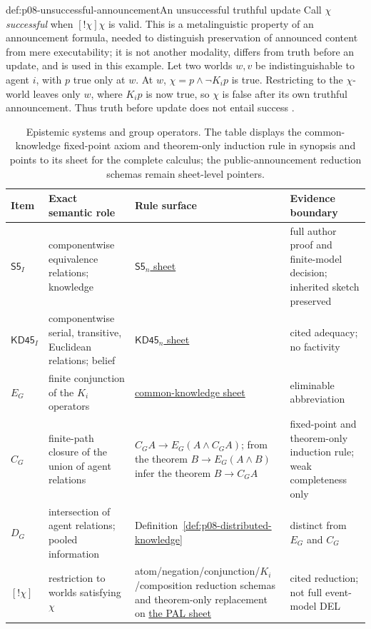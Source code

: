 \begin{hbexample}{def:p08-unsuccessful-announcement}{An unsuccessful truthful update}
Call \(\chi\) \emph{successful} when \([!\chi]\chi\) is valid.  This is a
metalinguistic property of an announcement formula, needed to distinguish
preservation of announced content from mere executability; it is not another
modality, differs from truth before an update, and is used in this example.
Let two worlds \(w,v\) be indistinguishable to agent \(i\), with \(p\) true
only at \(w\).  At \(w\), \(\chi=p\land\neg K_ip\) is true.  Restricting to
the \(\chi\)-world leaves only \(w\), where \(K_ip\) is now true, so \(\chi\)
is false after its own truthful announcement.  Thus truth before update does
not entail success \cite{VanDitmarschVanDerHoekKooi2007}.
\end{hbexample}

\begin{table}[!htbp]
\centering
\scriptsize
\begin{tabular}{@{}p{}p{}p{}p{}@{}}
\toprule
Item & Exact semantic role & Rule surface & Evidence boundary \\
\midrule
\(\mathsf{S5}_{I}\) & componentwise equivalence relations; knowledge &
\hyperref[sheet:hilbert-s5n]{\(\mathsf{S5}_n\) sheet} & full author proof and finite-model decision; inherited sketch preserved \\
\(\mathsf{KD45}_{I}\) & componentwise serial, transitive, Euclidean relations;
belief & \hyperref[sheet:hilbert-kd45n]{\(\mathsf{KD45}_n\) sheet} & cited adequacy; no factivity \\
\(E_G\) & finite conjunction of the \(K_i\) operators &
\hyperref[sheet:hilbert-common-knowledge]{common-knowledge sheet} & eliminable abbreviation \\
  \(C_G\) & finite-path closure of the union of agent relations &
  \(C_GA\to E_G(A\land C_GA)\); from the theorem
  \(B\to E_G(A\land B)\) infer the theorem \(B\to C_GA\) & fixed-point and theorem-only induction rule;
  weak completeness only \\
  \(D_G\) & intersection of agent relations; pooled information &
  Definition~\ref{def:p08-distributed-knowledge} & distinct from \(E_G\) and \(C_G\) \\
  \([!\chi]\) & restriction to worlds satisfying \(\chi\) &
  atom/negation/conjunction/\(K_i\)/composition reduction schemas and
  theorem-only replacement on \hyperref[sheet:hilbert-pal]{the PAL sheet} & cited reduction; not full event-model DEL \\
\bottomrule
\end{tabular}
\caption{Epistemic systems and group operators.  The table displays the
common-knowledge fixed-point axiom and theorem-only induction rule in synopsis
and points to its sheet for the complete calculus; the public-announcement
reduction schemas remain sheet-level pointers.}
\label{tab:p08-epistemic-systems}
\end{table}

